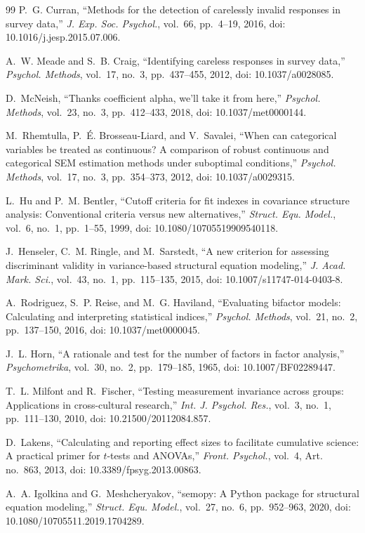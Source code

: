 \documentclass[journal,a4paper]{IEEEtran}
\begin{document}
\begin{thebibliography}{99}
P.~G. Curran, ``Methods for the detection of carelessly invalid responses in survey data,'' \emph{J. Exp. Soc. Psychol.}, vol.~66, pp.~4--19, 2016, doi: 10.1016/j.jesp.2015.07.006.

A.~W. Meade and S.~B. Craig, ``Identifying careless responses in survey data,'' \emph{Psychol. Methods}, vol.~17, no.~3, pp.~437--455, 2012, doi: 10.1037/a0028085.

D.~McNeish, ``Thanks coefficient alpha, we'll take it from here,'' \emph{Psychol. Methods}, vol.~23, no.~3, pp.~412--433, 2018, doi: 10.1037/met0000144.

M.~Rhemtulla, P.~\'E. Brosseau-Liard, and V.~Savalei, ``When can categorical variables be treated as continuous? A comparison of robust continuous and categorical SEM estimation methods under suboptimal conditions,'' \emph{Psychol. Methods}, vol.~17, no.~3, pp.~354--373, 2012, doi: 10.1037/a0029315.

L.~Hu and P.~M. Bentler, ``Cutoff criteria for fit indexes in covariance structure analysis: Conventional criteria versus new alternatives,'' \emph{Struct. Equ. Model.}, vol.~6, no.~1, pp.~1--55, 1999, doi: 10.1080/10705519909540118.

J.~Henseler, C.~M. Ringle, and M.~Sarstedt, ``A new criterion for assessing discriminant validity in variance-based structural equation modeling,'' \emph{J. Acad. Mark. Sci.}, vol.~43, no.~1, pp.~115--135, 2015, doi: 10.1007/s11747-014-0403-8.

A.~Rodriguez, S.~P. Reise, and M.~G. Haviland, ``Evaluating bifactor models: Calculating and interpreting statistical indices,'' \emph{Psychol. Methods}, vol.~21, no.~2, pp.~137--150, 2016, doi: 10.1037/met0000045.

J.~L. Horn, ``A rationale and test for the number of factors in factor analysis,'' \emph{Psychometrika}, vol.~30, no.~2, pp.~179--185, 1965, doi: 10.1007/BF02289447.

T.~L. Milfont and R.~Fischer, ``Testing measurement invariance across groups: Applications in cross-cultural research,'' \emph{Int. J. Psychol. Res.}, vol.~3, no.~1, pp.~111--130, 2010, doi: 10.21500/20112084.857.

D.~Lakens, ``Calculating and reporting effect sizes to facilitate cumulative science: A practical primer for $t$-tests and ANOVAs,'' \emph{Front. Psychol.}, vol.~4, Art. no.~863, 2013, doi: 10.3389/fpsyg.2013.00863.

A.~A. Igolkina and G.~Meshcheryakov, ``semopy: A Python package for structural equation modeling,'' \emph{Struct. Equ. Model.}, vol.~27, no.~6, pp.~952--963, 2020, doi: 10.1080/10705511.2019.1704289.

\end{thebibliography}
\end{document}
